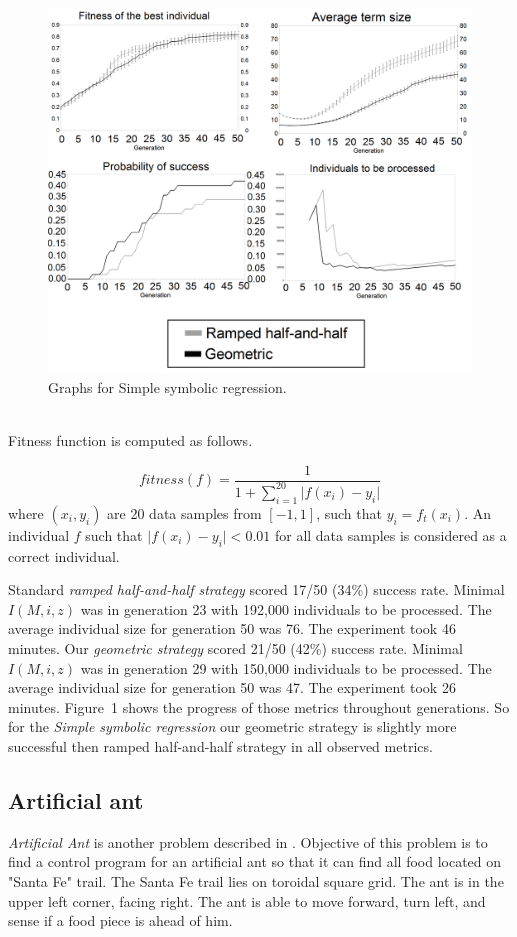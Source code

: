\documentclass[conference]{IEEEtran}
\begin{document}
\begin{figure}[h!]
  \caption{Graphs for Simple symbolic regression.}
  \centering
    \includegraphics[scale=0.15]{imgs/cec/SSR.PNG}
\end{figure}

~\\Fitness function is computed as follows.

$$ fitness(f) =  \frac{1}{1+ \sum\limits_{i=1}^{20}{ \vert f(x_i)-y_i }\vert }  $$
where $(x_i,y_i)$ are 20 data samples from $[-1,1]$, such that $y_i = f_t(x_i)$.
An individual $f$ such that $\vert f(x_i)-y_i \vert < 0.01 $ for all data samples is 
considered as a correct individual.

Standard \textit{ramped half-and-half strategy} scored 17/50 (34\%) success rate. 
Minimal $I(M,i,z)$ was in generation 23 with 192,000 individuals to be processed.
The average individual size for generation 50 was 76.
The experiment took 46 minutes.
Our \textit{geometric strategy} scored 21/50 (42\%) success rate. 
Minimal $I(M,i,z)$ was in generation 29 with 150,000 individuals to be processed.
The average individual size for generation 50 was 47.
The experiment took 26 minutes.
Figure~1 shows the progress of those metrics throughout generations.
So for the \textit{Simple symbolic regression}
our geometric strategy is slightly more successful then 
ramped half-and-half strategy in all observed metrics.

\subsection{Artificial ant}
\textit{Artificial Ant} is another problem described
in \cite{koza92}. Objective of this problem is to 
find a control program for an artificial ant so
that it can find all food located on "Santa Fe" trail.
The Santa Fe trail lies on toroidal square grid.
The ant is in the upper left corner, facing right.
The ant is able to move forward, turn left, and sense if a food 
piece is ahead of him.
\end{document}
